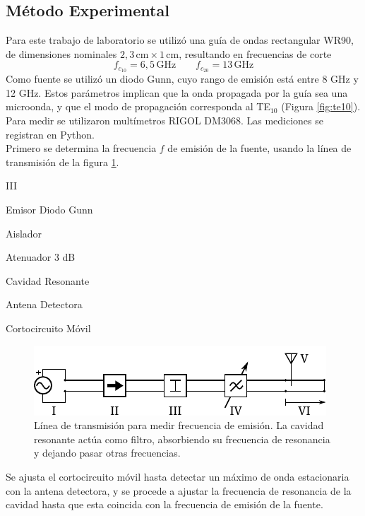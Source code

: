 \documentclass[11pt,a4paper]{article}
\begin{document}
\begin{multicols}{2}
\section{Método Experimental}
Para este trabajo de laboratorio se utilizó una guía de ondas rectangular WR90, de dimensiones nominales $2,3\, \mathrm{cm} \times 1\, \mathrm{cm}$, resultando en frecuencias de corte
\begin{equation}
    f_{c_{10}} = 6,5\, \mathrm{GHz} \qquad f_{c_{20}}=13\,\mathrm{GHz}
\end{equation} 
Como fuente se utilizó un diodo Gunn, cuyo rango de emisión está entre 8 GHz y 12 GHz. 
Estos parámetros implican que la onda propagada por la guía sea una microonda, y que el modo de propagación corresponda al TE$_{10}$ (Figura \ref{fig:te10}).\\

Para medir se utilizaron multímetros RIGOL DM3068. Las mediciones se registran en Python. \\


Primero se determina la frecuencia $f$ de emisión de la fuente, usando la línea de transmisión de la figura \ref{fig:arr1}.
\begin{multicols}{2}
    \begin{labeling}{III} 
        \item [I] Emisor Diodo Gunn
        \item [II] Aislador
        \item [III] Atenuador 3 dB
        \item [IV] Cavidad Resonante
        \item [V] Antena Detectora
        \item [VI] Cortocircuito Móvil
    \end{labeling}        
\end{multicols}
\begin{figure}[H]
    \centering
    \includegraphics[width=\linewidth]{Images/arreglo1.pdf}
    \caption{Línea de transmisión para medir frecuencia de emisión. La cavidad resonante actúa como filtro, absorbiendo su frecuencia de resonancia y dejando pasar otras frecuencias.}
    \label{fig:arr1}
\end{figure}
Se ajusta el cortocircuito móvil hasta detectar un máximo de onda estacionaria con la antena detectora, y se procede a ajustar la frecuencia de resonancia de la cavidad hasta que esta coincida con la frecuencia de emisión de la fuente.\\ 


\end{multicols}
\end{document}
